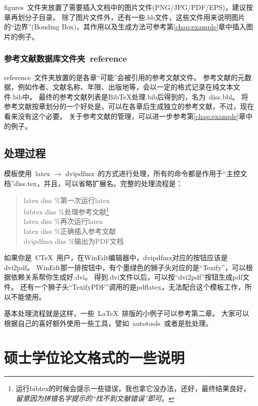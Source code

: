 figures~文件夹放置了需要插入文档中的图片文件(PNG/JPG/PDF/EPS)，建议按章再划分子目录。
除了图片文件外，还有一些.bb文件，这些文件用来说明图片的``边界''(Bouding Box)，其作用以及生成方法可参考第\ref{chap:example}章中插入图片的例子。

\subsubsection{参考文献数据库文件夹~reference}
\label{sec:bibdir}

reference~文件夹放置的是各章``可能''会被引用的参考文献文件。
参考文献的元数据，例如作者、文献名称、年限、出版地等，会以一定的格式记录在纯文本文件.bib中。
最终的参考文献列表是BibTeX处理.bib后得到的，名为~diss.bbl。
将参考文献按章划分的一个好处是，可以在各章后生成独立的参考文献，不过，现在看来没有这个必要。
关于参考文献的管理，可以进一步参考第\ref{chap:example}章中的例子。


\subsection{处理过程}
\label{sec:process}

模板使用~latex $\rightarrow$ dvipdfmx~的方式进行处理，所有的命令都是作用于“主控文档”diss.tex，并且，可以省略扩展名。完整的处理流程是：
\begin{quote}
latex diss  \%第一次运行latex \\
bibtex diss  \%处理参考文献\footnote{运行bibtex的时候会提示一些错误，我也拿它没办法，还好，最终结果良好，\emph{留意因为拼错名字提示的``找不到文献错误''即可}。} \\
latex diss  \%再次运行latex \\
latex diss  \%正确插入参考文献 \\ 
dvipdfmx diss \%输出为PDF文档
\end{quote}

如果你是~C\TeX~用户，在WinEdt编辑器中，dvipdfmx对应的按钮应该是dvi2pdf。
WinEdt那一排按钮中，有个墨绿色的狮子头对应的是``Texify''，可以根据依赖关系帮你生成好.dvi。
得到.dvi文件以后，可以按``dvi2pdf''按钮生成pdf文件。
还有一个狮子头``TexifyPDF''调用的是pdflatex，无法配合这个模板工作，所以不能使用。

基本处理流程就是这样，一些~\LaTeX~排版的小例子可以参考第二章。
大家可以根据自己的喜好额外使用一些工具，譬如~autotools~或者是批处理。

\section{硕士学位论文格式的一些说明}
\label{sec:thesisformat}

